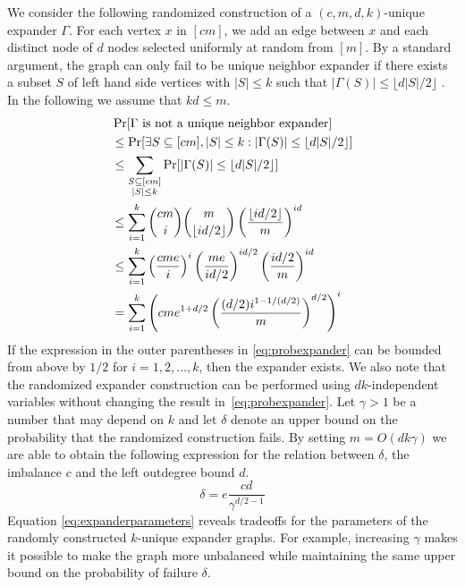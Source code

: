 \documentclass[a4paper,11pt]{article}
\theoremstyle{plain}
\theoremstyle{definition}
\begin{document}
We consider the following randomized construction of a $(c,m,d,k)$-unique expander $\Gamma$. 
For each vertex $x$ in $[cm]$, we add an edge between $x$ and each distinct node of $d$ nodes selected uniformly at random from $[m]$.  
By a standard argument, the graph can only fail to be unique neighbor expander if there exists a subset $S$ of left hand side vertices with $|S| \leq k$ such that $|\Gamma(S)| \leq \lfloor d|S|/2 \rfloor$ \cite[Lemma 2.8]{siegel2004}.
In the following we assume that $kd \leq m$. 
\begin{align}
&\Pr[\Gamma \text{ is not a unique neighbor expander}] \notag \\
&\leq \Pr[\exists S \subseteq [cm], |S| \leq k : |\Gamma(S)| \leq \lfloor d|S|/2 \rfloor] \notag \\
&\leq \sum_{\substack{S \subseteq [cm]\\ |S| \leq k}} \Pr[|\Gamma(S)| \leq \lfloor d|S|/2 \rfloor] \notag \\
&\leq \sum_{i = 1}^{k} \binom{cm}{i} \binom{m}{\lfloor id/2 \rfloor} \left(\frac{\lfloor id/2 \rfloor}{m}\right)^{id} \notag \\ 
&\leq \sum_{i=1}^{k} \left(\frac{cme}{i}\right)^{i} \left(\frac{me}{id/2}\right)^{id/2} \left(\frac{id/2}{m}\right)^{id} \notag \\
&= \sum_{i=1}^{k} \left( cm e^{1 + d/2} \left(\frac{(d/2)i^{1 - 1/(d/2)}}{m}\right)^{d/2} \right)^{i} \label{eq:probexpander}
\end{align}
If the expression in the outer parentheses in \eqref{eq:probexpander} can be bounded from above by $1/2$ for $i = 1,2,\dots,k$, then the expander exists.
We also note that the randomized expander construction can be performed using $dk$-independent variables without changing the result in~\eqref{eq:probexpander}. 
Let $\gamma > 1$ be a number that may depend on $k$ and let $\delta$ denote an upper bound on the probability that the randomized construction fails. 
By setting $m = O(dk\gamma)$ we are able to obtain the following expression for the relation between $\delta$, the imbalance $c$ and the left outdegree bound $d$.
\begin{equation}
\delta = e\frac{cd}{\gamma^{d/2 - 1}} \label{eq:expanderparameters}
\end{equation}
Equation \eqref{eq:expanderparameters} reveals tradeoffs for the parameters of the randomly constructed $k$-unique expander graphs.
For example, increasing $\gamma$ makes it possible to make the graph more unbalanced while maintaining the same upper bound on the probability of failure $\delta$. 
\end{document}
